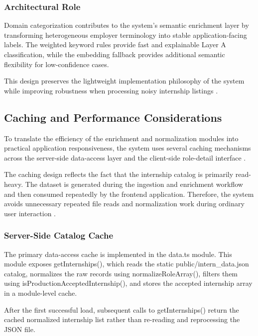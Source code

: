 \subsubsection*{Architectural Role}

Domain categorization contributes to the system's semantic enrichment layer by transforming heterogeneous employer terminology into stable application-facing labels. The weighted keyword rules provide fast and explainable Layer A classification, while the embedding fallback provides additional semantic flexibility for low-confidence cases.

This design preserves the lightweight implementation philosophy of the system while improving robustness when processing noisy internship listings \cite{schwartz2020green, reimers2019sentence, sarawagi2008information}.

\subsection{Caching and Performance Considerations}

To translate the efficiency of the enrichment and normalization modules into practical application responsiveness, the system uses several caching mechanisms across the server-side data-access layer and the client-side role-detail interface \cite{smith1982cache, jain1991art}.

The caching design reflects the fact that the internship catalog is primarily read-heavy. The dataset is generated during the ingestion and enrichment workflow and then consumed repeatedly by the frontend application. Therefore, the system avoids unnecessary repeated file reads and normalization work during ordinary user interaction \cite{kleppmann2017designing}.

\subsubsection*{Server-Side Catalog Cache}

The primary data-access cache is implemented in the data.ts module. This module exposes getInternships(), which reads the static public/intern\_data.json catalog, normalizes the raw records using normalizeRoleArray(), filters them using isProductionAcceptedInternship(), and stores the accepted internship array in a module-level cache.

After the first successful load, subsequent calls to getInternships() return the cached normalized internship list rather than re-reading and reprocessing the JSON file.

